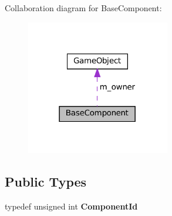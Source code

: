 Collaboration diagram for Base\+Component\+:
\nopagebreak
\begin{figure}[H]
\begin{center}
\leavevmode
\includegraphics[width=178pt]{classBaseComponent__coll__graph}
\end{center}
\end{figure}
\subsection*{Public Types}
\begin{DoxyCompactItemize}
\item 
\mbox{\label{classBaseComponent_a1815699cb565ac2ec254cf61174015cf}} 
typedef unsigned int {\bfseries Component\+Id}
\end{DoxyCompactItemize}
